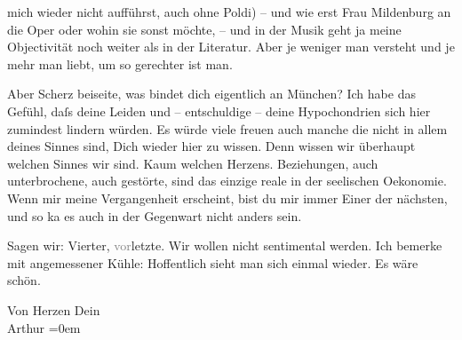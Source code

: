                mich wieder nicht aufführst, auch ohne Poldi)
               – und wie erst Frau Mildenburg an die Oper oder wohin sie sonst möchte, – und in der
               Musik geht ja meine Objectivität noch weiter als in der Literatur. Aber je weniger
               man versteht und je mehr man liebt, um so gerechter ist man.\pend
           
\pstart
           Aber Scherz beiseite, was bindet dich eigentlich an München? Ich habe das Gefühl, daſs deine Leiden und – entschuldige – deine
               Hypochondrien sich hier zumindest lindern würden. Es würde viele freuen auch manche
               die nicht in allem deines Sinnes sind, Dich wieder hier zu wissen. Denn wissen wir
               überhaupt {\pb}welchen
               Sinnes wir sind. Kaum welchen Herzens. Beziehungen, auch unterbrochene, auch
               gestörte, sind das einzige reale in der seelischen Oekonomie. \label{LL141-1v}\label{LL141-1h}Wenn mir meine Vergangenheit erscheint, bist du mir immer Einer
               der nächsten, und so ka{\geminationn} es auch in der Gegenwart nicht
               anders sein.\pend
           
\pstart
           \label{K_L02533-2v}\label{K_L02533-2} Sagen wir: Vierter, \textcolor{gray}{vor}letzte. Wir wollen nicht
               sentimental \introOben{}werden.\introOben{} Ich bemerke mit angemessener Kühle:
               Hoffentlich sieht man sich einmal wieder. Es wäre schön.\pend
           
\pstart
           Von Herzen Dein{\\[\baselineskip]}\spacefill\mbox{Arthur}\pend
           \leftskip=0em{}\endnumbering{}  \newcommand{\dateiname}{L02533}\newcommand{\titel}{Arthur Schnitzler an Hermann Bahr, 17. 3. 1930}\newcommand{\editorInnen}{Herausgegeben von Martin Anton Müller}
